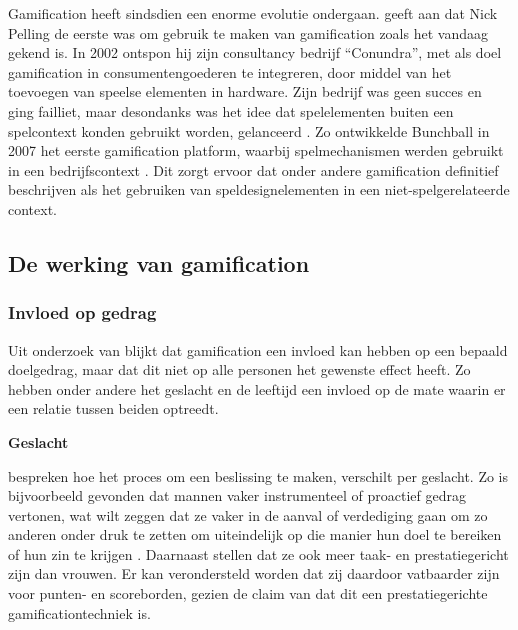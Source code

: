 Gamification heeft sindsdien een enorme evolutie ondergaan. \textcite{Dreimane2021} geeft aan dat Nick Pelling de eerste was om gebruik te maken van gamification zoals het vandaag gekend is. In 2002 ontspon hij zijn consultancy bedrijf “Conundra”, met als doel gamification in consumentengoederen te integreren, door middel van het toevoegen van speelse elementen in hardware. Zijn bedrijf was geen succes en ging failliet, maar desondanks was het idee dat spelelementen buiten een spelcontext konden gebruikt worden, gelanceerd \autocite{Khaitova2021}. Zo ontwikkelde Bunchball in 2007 het eerste gamification platform, waarbij spelmechanismen werden gebruikt in een bedrijfscontext \autocite{Khaitova2021}. Dit zorgt ervoor dat onder andere \textcite{Deterding2011} gamification definitief beschrijven als het gebruiken van speldesignelementen in een niet-spelgerelateerde context.

\subsection{De werking van gamification}
\label{ssec:werking-gamification}

\subsubsection{Invloed op gedrag}
Uit onderzoek van \textcite{Hamari2013a} blijkt dat gamification een invloed kan hebben op een bepaald doelgedrag, maar dat dit niet op alle personen het gewenste effect heeft. Zo hebben onder andere het geslacht en de leeftijd een invloed op de mate waarin er een relatie tussen beiden optreedt.

\vspace{2mm}
\textbf{Geslacht}
\vspace{1mm}

\textcite{Venkatesh2000} bespreken hoe het proces om een beslissing te maken, verschilt per geslacht. Zo is bijvoorbeeld gevonden dat mannen vaker instrumenteel of proactief gedrag vertonen, wat wilt zeggen dat ze vaker in de aanval of verdediging gaan om zo anderen onder druk te zetten om uiteindelijk op die manier hun doel te bereiken of hun zin te krijgen \autocite{Spence1980}. Daarnaast stellen \textcite{Hoffman1972, Minton1980} dat ze ook meer taak- en prestatiegericht zijn dan vrouwen.
Er kan verondersteld worden dat zij daardoor vatbaarder zijn voor punten- en scoreborden, gezien de claim van \textcite{Hamari2014} dat dit een prestatiegerichte gamificationtechniek is.

